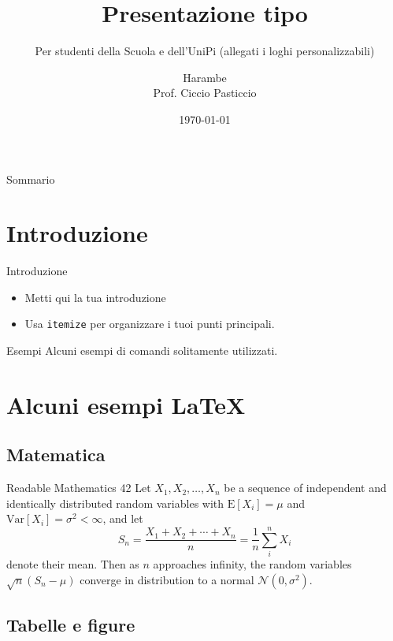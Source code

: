\documentclass[10pt,xcolor={table,dvipsnames},t]{beamer}
\title[Presentazione]{Presentazione tipo}
\subtitle{Per studenti della Scuola e dell'UniPi (allegati i loghi personalizzabili)}
\author{Harambe\\[0.7em]{\normalsize Prof. Ciccio Pasticcio}}
\institute{Classe di Scienze e Filosofia}
\date{\today}
\begin{document}
\begin{frame}
  \titlepage
\end{frame}

\begin{frame}{Sommario}
  \tableofcontents
\end{frame}
\section{Introduzione}
\begin{frame}{Introduzione}

\begin{itemize}
  \item Metti qui la tua introduzione
  \item Usa \texttt{itemize} per organizzare i tuoi punti principali.
\end{itemize}

\begin{block}{Esempi}
Alcuni esempi di comandi solitamente utilizzati.
\end{block}

\end{frame}
\section{Alcuni esempi \LaTeX{}}
\subsection{Matematica}
\begin{frame}{Readable Mathematics 42}
Let $X_1, X_2, \ldots, X_n$ be a sequence of independent and identically distributed random variables with $\text{E}[X_i] = \mu$ and $\text{Var}[X_i] = \sigma^2 < \infty$, and let
$$S_n = \frac{X_1 + X_2 + \cdots + X_n}{n}
      = \frac{1}{n}\sum_{i}^{n} X_i$$
denote their mean. Then as $n$ approaches infinity, the random variables $\sqrt{n}(S_n - \mu)$ converge in distribution to a normal $\mathcal{N}(0, \sigma^2)$.

\end{frame}
\subsection{Tabelle e figure}
\end{document}
